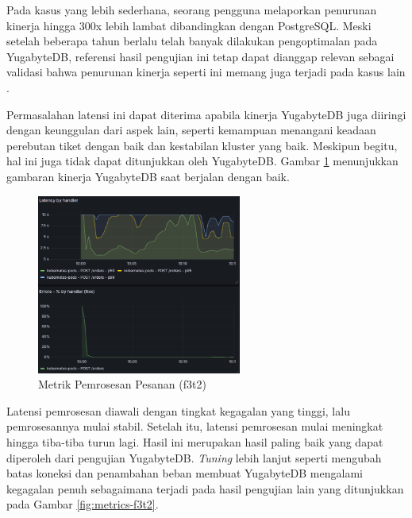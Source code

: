 Pada kasus yang lebih sederhana, seorang pengguna melaporkan penurunan kinerja hingga 300x lebih lambat dibandingkan dengan PostgreSQL. Meski setelah beberapa tahun berlalu telah banyak dilakukan pengoptimalan pada YugabyteDB, referensi hasil pengujian ini tetap dapat dianggap relevan sebagai validasi bahwa penurunan kinerja seperti ini memang juga terjadi pada kasus lain \parencite{yugabyteIssuePerformance}.

Permasalahan latensi ini dapat diterima apabila kinerja YugabyteDB juga diiringi dengan keunggulan dari aspek lain, seperti kemampuan menangani keadaan perebutan tiket dengan baik dan kestabilan kluster yang baik. Meskipun begitu, hal ini juga tidak dapat ditunjukkan oleh YugabyteDB. Gambar \ref{fig:metrics-f3t1} menunjukkan gambaran kinerja YugabyteDB saat berjalan dengan baik.

\begin{figure}[htbp]
    \centering
    \includegraphics[width=0.6\textwidth]{resources/chapter-4/latensi-yugabyte-success.png}
    \caption{Metrik Pemrosesan Pesanan (f3t2)}
    \label{fig:metrics-f3t1}
\end{figure}

Latensi pemrosesan diawali dengan tingkat kegagalan yang tinggi, lalu pemrosesannya mulai stabil. Setelah itu, latensi pemrosesan mulai meningkat hingga tiba-tiba turun lagi. Hasil ini merupakan hasil paling baik yang dapat diperoleh dari pengujian YugabyteDB. \textit{Tuning} lebih lanjut seperti mengubah batas koneksi dan penambahan beban membuat YugabyteDB mengalami kegagalan penuh sebagaimana terjadi pada hasil pengujian lain yang ditunjukkan pada Gambar \ref{fig:metrics-f3t2}.


